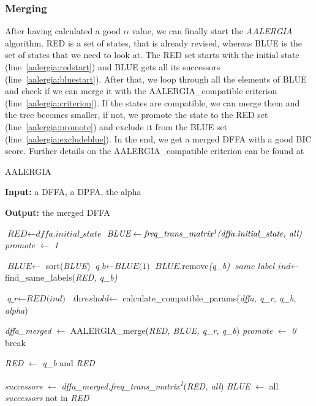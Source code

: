 \documentclass[
a4paper,
12pt
]{scrartcl}
\begin{document}
\subsubsection{Merging }

After having calculated a good $\alpha$ value, we can finally start the \emph{AALERGIA} algorithm. RED is a set of states, that is already revised, whereas BLUE is the set of states that we need to look at. The RED set starts with the initial state (line~\ref{aalergia:redstart}) and BLUE gets all its successors (line~\ref{aalergia:bluestart}). After that, we loop through all the elements of BLUE and check if we can merge it with the AALERGIA\_compatible criterion (line~\ref{aalergia:criterion}). If the states are compatible, we can merge them and the tree becomes smaller, if not, we promote the state to the RED set (line~\ref{aalergia:promote}) and exclude it from the BLUE set (line~\ref{aalergia:excludeblue}). In the end, we get a merged DFFA with a good BIC score. Further details on the AALERGIA\_compatible criterion can be found at \cite{Mao.}

\begin{algorithm}[H]
\caption{AALERGIA}\label{alg:aalergia}
\begin{algorithmic}[1]
\item \textbf{Input:}  a DFFA, a DPFA, the alpha
\item \textbf{Output:} the merged DFFA

\State $\textit{RED} \gets \textit{dffa.initial\_state}$ \label{aalergia:redstart}
\State $\textit{BLUE} \gets \textit{freq\_trans\_matrix\textsuperscript{1}(dffa.initial\_state, all)}$ \label{aalergia:bluestart}
\State \textit{promote} $\gets$ \textit{1}


 \State $\textit{BLUE} \gets$ sort(\textit{BLUE})
 \State $\textit{q\_b} \gets \textit{BLUE(1)}$
 \State $\textit{BLUE}$.remove\textit{(q\_b)}
 \State $\textit{same\_label\_ind} \gets $find\_same\_labels(\textit{RED, q\_b)}

        \State $\textit{q\_r} \gets \textit{RED(ind)}$
        \State $\textit{threshold} \gets$ calculate\_compatible\_params(\textit{dffa, q\_r, q\_b, alpha})

         \label{aalergia:criterion}
          \State \textit{dffa\_merged} $\gets$ AALERGIA\_merge(\textit{RED, BLUE, q\_r, q\_b})
          \State \textit{promote} $\gets$ \textit{0}
          \State break
        \EndIf
\EndFor

          \State \textit{RED} $\gets$ \textit{q\_b} and \textit{RED} \label{aalergia:promote}
        \EndIf

    \State \textit{successors} $\gets$ \textit{dffa\_merged.freq\_trans\_matrix\textsuperscript{1}}(\textit{RED, all})
    \State \textit{BLUE} $\gets$ all \textit{successors} not in \textit{RED} \label{aalergia:excludeblue}
  \EndWhile
\end{algorithmic}
\end{algorithm}
\end{document}
